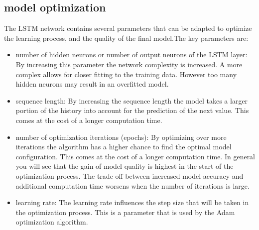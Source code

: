 \subsection{model optimization}
The LSTM network contains several parameters that can be adapted to optimize the learning process, and the quality of the final model.The key parameters are:
\begin{itemize}
\item number of hidden neurons or number of output neurons of the LSTM layer: By increasing this parameter the network complexity is increased. A more complex allows for closer fitting to the training data. However too many hidden neurons may result in an overfitted model. 
\item sequence length: By increasing the sequence length the model takes a larger portion of the history into account for the prediction of the next value. This comes at the cost of a longer computation time. 
\item number of optimization iterations (epochs): By optimizing over more iterations the algorithm has a higher chance to find the optimal model configuration. This comes at the cost of a longer computation time. In general you will see that the gain of model quality is highest in the start of the optimization process. The trade off between increased model accuracy and additional computation time worsens when the number of iterations is large. 
\item learning rate: The learning rate influences the step size that will be taken in the optimization process. This is a parameter that is used by the Adam optimization algorithm. 
\end{itemize}


%
%




